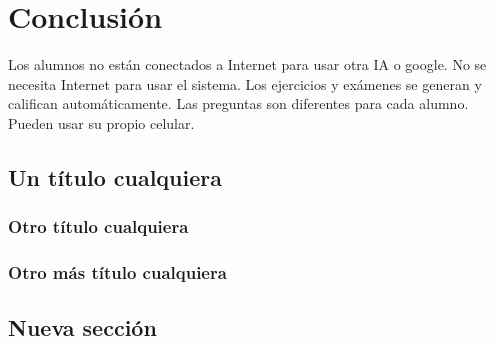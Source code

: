
\chapter{Conclusión}
\label{ch:conclusion}

Los alumnos no están conectados a Internet para usar otra IA o google.
No se necesita Internet para usar el sistema.
Los ejercicios y exámenes se generan y califican automáticamente.
Las preguntas son diferentes para cada alumno.
Pueden usar su propio celular.


\section{Un título cualquiera}

\lipsum[1]

\subsection{Otro título cualquiera}

\lipsum[2-4]

\subsection{Otro más título cualquiera}

\lipsum[5-6]

\section{Nueva sección}

\lipsum[1-3]

